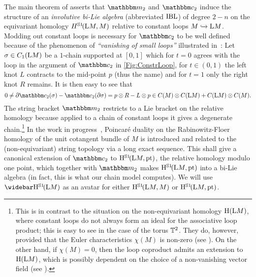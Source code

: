 \documentclass[\MainFolder/Text.tex]{subfiles}
\begin{document}
The main theorem of \cite{Sullivan2002} asserts that $\StringOp_2$ and $\StringCoOp_2$ induce the structure of an \emph{involutive bi-Lie algebra} (abbreviated $\mathrm{IBL}$) of degree $2-n$ on the equivariant homology $H^{\mathbb{S}{1}}\!(\mathrm{L} M,M)$ relative to constant loops $M\xhookrightarrow{}\mathrm{L} M$. Modding out constant loops is necessary for $\StringCoOp_2$ to be well defined because of the phenomenon of \emph{``vanishing of small loops''} illustrated in~\cite{Cieliebak2007}:  Let $\sigma\in C_1(\mathrm{L} M)$ be a $1$-chain supported at $[0,1]$ which for $t=0$ agrees with the loop in the argument of $\StringCoOp_2$ in \ref{Fig:ConstrLoop}, for $t\in (0,1)$ the left knot $L$ contracts to the mid-point $p$ (thus the name) and for $t=1$ only the right knot $R$ remains. It is then easy to see that 
\[ 0 \neq \Bdd \StringCoOp_2(\sigma) - \StringCoOp_2(\Bdd \sigma) = p\otimes R - L \otimes p \in C(M)\otimes C(\Loop M) + C(\Loop M)\otimes C(M). \]
The string bracket $\StringOp_2$ restricts to a Lie bracket on the relative homology because applied to a chain of constant loops it gives a degenerate chain.\footnote{This is in contrast to the situation on the non-equivariant homology $\mathrm{H}(\mathrm{L} M)$, where constant loops do not always form an ideal for the associative loop product; this is easy to see in the case of the torus $\mathbb{T}^2$. They do, however, provided that the Euler characteristics $\chi(M)$ is non-zero (see \cite{Tamanoi2010}). On the other hand, if $\chi(M)=0$, then the loop coproduct admits an extension to $\mathrm{H}(\mathrm{L} M)$, which is possibly dependent on the choice of a non-vanishing vector field (see \cite{Basu2011}).}
In the work in progress~\cite{CieliebakHingston2018}, Poincar\'e duality on the Rabinowitz-Floer homology of the unit cotangent bundle of $M$ is introduced and related to the (non-equivariant) string topology via a long exact sequence. This shall give a canonical extension of $\StringCoOp_2$ to $\mathrm{H}^{\mathbb{S}{1}}\!(\mathrm{L} M,\mathrm{pt})$, the relative homology modulo one point, which together with $\StringOp_2$ makes $\mathrm{H}^{\mathbb{S}{1}}\!(\mathrm{L} M,\mathrm{pt})$ into a bi-Lie algebra (in fact, this is what our chain model computes). We will use $\RedEquivHom(\Loop M)$ as an avatar for either $\mathrm{H}^{\mathbb{S}{1}}\!(\mathrm{L} M,M)$ or $\mathrm{H}^{\mathbb{S}{1}}\!(\mathrm{L} M,\mathrm{pt})$.
\end{document}
